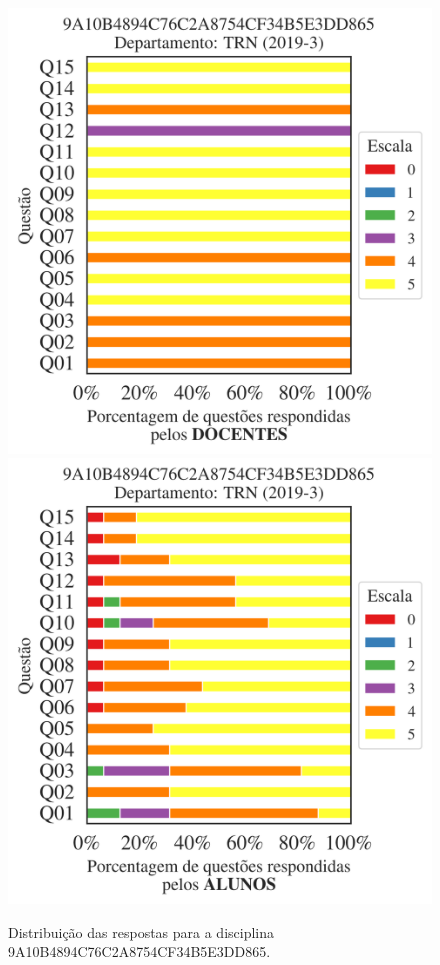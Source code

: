 \documentclass[a4paper,10pt]{article}
\begin{document}
\begin{figure}[h]
\centering
\includegraphics[width=0.485\linewidth]{analise_disciplina_departamento_TRN_9A10B4894C76C2A8754CF34B5E3DD865_docentes.png}
\includegraphics[width=0.485\linewidth]{analise_disciplina_departamento_TRN_9A10B4894C76C2A8754CF34B5E3DD865_alunos.png}
\caption{\label{fig:analise_geral_departamento}                Distribuição das respostas para a disciplina 9A10B4894C76C2A8754CF34B5E3DD865. }
\end{figure}
\end{document}
